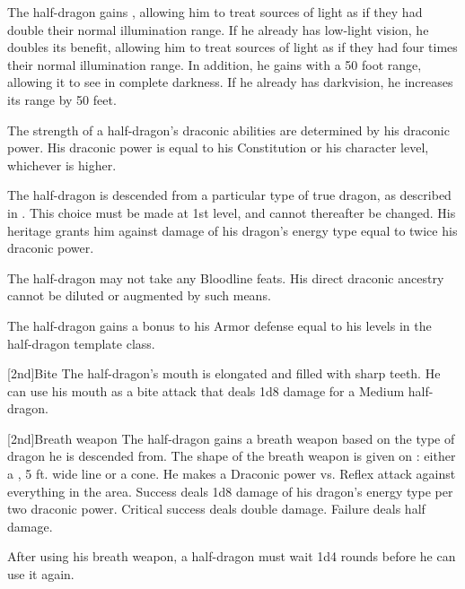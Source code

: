             The half-dragon gains , allowing him to treat sources of light as if they had double their normal illumination range.
            If he already has low-light vision, he doubles its benefit, allowing him to treat sources of light as if they had four times their normal illumination range.
            In addition, he gains  with a 50 foot range, allowing it to see in complete darkness.
            If he already has darkvision, he increases its range by 50 feet.

            The strength of a half-dragon's draconic abilities are determined by his draconic power.
            His draconic power is equal to his Constitution or his character level, whichever is higher.

             The half-dragon is descended from a particular type of true dragon, as described in . This choice must be made at 1st level, and cannot thereafter be changed.
            His heritage grants him  against damage of his dragon's energy type equal to twice his draconic power.

            The half-dragon may not take any Bloodline feats. His direct draconic ancestry cannot be diluted or augmented by such means.

             The half-dragon gains a bonus to his Armor defense equal to his levels in the half-dragon template class.

            [2nd]{Bite} 
            The half-dragon's mouth is elongated and filled with sharp teeth.
            He can use his mouth as a bite attack that deals 1d8 damage for a Medium half-dragon.

            [2nd]{Breath weapon} The half-dragon gains a breath weapon based on the type of dragon he is descended from.
            The shape of the breath weapon is given on : either a \arealarge, 5 ft. wide line or a \areamed cone.
            He makes a Draconic power vs. Reflex attack against everything in the area.
            Success deals 1d8 damage of his dragon's energy type per two draconic power.
            Critical success deals double damage.
            Failure deals half damage.

            After using his breath weapon, a half-dragon must wait 1d4 rounds before he can use it again.

